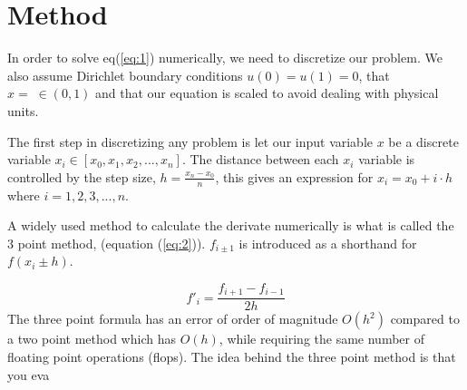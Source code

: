 \section*{Method}
In order to solve eq(\ref{eq:1}) numerically, we need to discretize our problem. We also assume Dirichlet boundary conditions $u(0) = u(1) = 0$, that $x = \; \in (0,1)$ and that our equation is scaled to avoid dealing with physical units. \par The first step in discretizing any problem is let our input variable $x$ be a discrete variable $x_i \in \left[x_0, x_1, x_2, ..., x_n \right]$. The distance between each $x_i$ variable is controlled by the step size, $h = \frac{x_n -x_0}{n}$, this gives an expression for $x_i = x_0 + i\cdot h$ where $i = 1,2,3, ..., n$. 
\par A widely used method to calculate the derivate numerically is what is called the 3 point method, (equation (\ref{eq:2})). $f_{i \pm 1}$ is introduced as a shorthand for $ f(x_i \pm h)$.   

\begin{equation}\label{eq:2}
  f'_i = \frac{f_{i+1} - f_{i-1}}{2h}
\end{equation}
The three point formula has an error of order of magnitude $O(h^2)$ compared to a two point method which has $O(h)$, while requiring the same number of floating point operations (flops). The idea behind the three point method is that you eva 